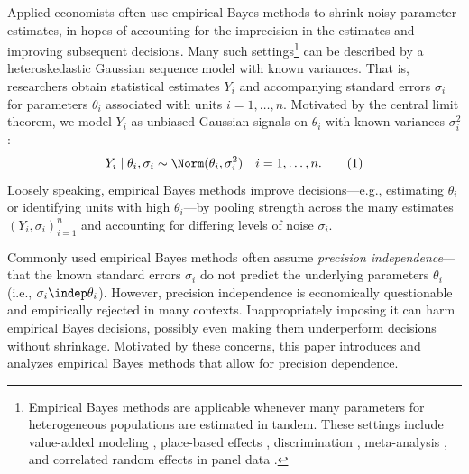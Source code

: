\documentclass[12pt, reqno]{amsart}
\newcommand\numberthis{\addtocounter{equation}{1}\tag{\theequation}}
\numberwithin{equation}{section}
\begin{document}
Applied economists often use empirical Bayes methods to shrink noisy parameter estimates,
in hopes of accounting for the imprecision in the estimates and improving subsequent
decisions. Many such settings\footnote{Empirical Bayes methods are applicable whenever
many parameters for heterogeneous populations are estimated in tandem. These settings
include value-added modeling \citep
{angrist2017leveraging,mountjoy2021returns,chandra2016health,doyle2017evaluating,hull2018estimating,einav2022producing,abaluck2021mortality},
place-based effects \citep
{chyn2021neighborhoods,finkelstein2021place,chetty2018opportunity,chetty2018impacts,diamond2021standard,baum2019microgeography,aloni2023one},
discrimination \citep
{kline2022systemic,kline2023discrimination,rambachan2021identifying,egan2022harry,arnold2022measuring,montiel2021empirical},
meta-analysis \citep
{azevedo2020b,meager2022aggregating,andrews2019identification,elliott2022detecting,wernerfelt2022estimating,dellavigna2022rcts,abadie2023estimating},
and correlated random effects in panel data \citep
{chamberlain1984panel,arellano2009robust,bonhomme2020much,bonhomme2015grouped,liu2020forecasting,giacomini2023robust,bonhommedenis}.
}  can be described by a heteroskedastic Gaussian sequence model with known variances.
That is, researchers obtain statistical estimates $Y_i$ and accompanying standard errors
$\sigma_i$ for parameters $\theta_i$ associated with units $i=1,\ldots, n$. Motivated by
the central limit theorem, we model $Y_i$ as unbiased Gaussian signals on $\theta_i$ with
known variances $\sigma_i^2$:
 \[Y_i
 \mid \theta_i,
\sigma_i \sim \Norm(\theta_i, \sigma_i^2) \quad i=1,\ldots, n. \numberthis 
\label{eq:gaussian_heteroskedastic_location}\]  Loosely speaking, empirical Bayes methods
improve decisions---e.g., estimating $\theta_i$ or identifying units with high
 $\theta_i$---by pooling strength across the many estimates $(Y_i, \sigma_i)_{i=1}^n$ and
 accounting for differing levels of noise $\sigma_i$.

Commonly used empirical Bayes methods often assume \emph{precision independence}---that
the known standard errors $\sigma_i$ do not predict the underlying parameters $\theta_i$
(i.e., $\sigma_i \indep \theta_i$). However, precision independence is economically
questionable and empirically rejected in many contexts. %
 Inappropriately imposing it can harm empirical Bayes decisions, possibly even making them
 underperform decisions without shrinkage. Motivated by these concerns, this paper
 introduces and analyzes empirical Bayes methods that allow for precision dependence.
\end{document}
